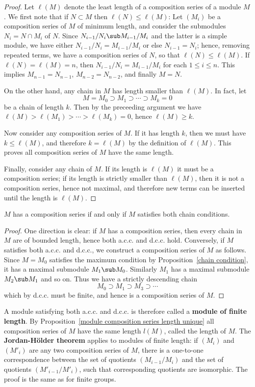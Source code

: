 \begin{proof}
Let $\ell(M)$ denote the least length of a composition series of a module $M$. We first note that if $N\subset M$ then $\ell(N)\leq\ell(M)$: Let $(M_i)$ be a composition series of $M$ of minimum length, and consider the submodules $N_i=N\cap M_i$ of $N$. Since $N_{i-1}/N_i\sub M_{i-1}/M_i$ and the latter is a simple module, we have either $N_{i-1}/N_i=M_{i-1}/M_i$ or else $N_{i-1}=N_i$; hence, removing repeated terms, we have a composition series of $N$, so that $\ell(N)\leq \ell(M)$. If $\ell(N)=\ell(M)=n$, then $N_{i-1}/N_i=M_{i-1}/M_i$ for each $1\leq i\leq n$. This implies $M_{n-1}=N_{n-1}$, $M_{n-2}=N_{n-2}$, and finally $M=N$.\par
On the other hand, any chain in $M$ has length smaller than $\ell(M)$. In fact, let 
\[M=M_0\supset M_1\supset\cdots\supset M_k=0\]
be a chain of length $k$. Then by the preceeding argument we have $\ell(M)>\ell(M_1)>\cdots>\ell(M_k)=0$, hence $\ell(M)\geq k$.\par
Now consider any composition series of $M$. If it has length $k$, then we must have $k\leq\ell(M)$, and therefore $k=\ell(M)$ by the definition of $\ell(M)$. This proves all composition series of $M$ have the same length.\par
Finally, consider any chain of $M$. If its length is $\ell(M)$ it must be a composition series; if its length is strictly smaller than $\ell(M)$, then it is not a composition series, hence not maximal, and therefore new terms can be inserted until the length is $\ell(M)$.
\end{proof}
\begin{proposition}\label{module composition series exist iff acc dcc}
$M$ has a composition series if and only if $M$ satisfies both chain conditions.
\end{proposition}
\begin{proof}
One direction is clear: if $M$ has a composition series, then every chain in $M$ are of bounded length, hence both a.c.c. and d.c.c. hold. Conversely, if $M$ satisfies both a.c.c. and d.c.c., we construct a composition series of $M$ as follows. Since $M=M_0$ satisfies the maximum condition by Proposition~\ref{chain condition}, it has a maximal submodule $M_1\sub M_0$. Similarly $M_1$ has a maximal submodule $M_2\sub M_1$ and so on. Thus we have a strictly descending chain 
\[M_0\supset M_1\supset M_3\supset\cdots\]
which by d.c.c. must be finite, and hence is a composition series of $M$.
\end{proof}
A module satisfying both a.c.c. and d.c.c. is therefore called a \textbf{module of finite length}. By Proposition~\ref{module composition series length unique} all composition series of $M$ have the same length $l(M)$, called the length of $M$. The \textbf{Jordan-H\"older theorem} applies to modules of finite length: if $(M_i)$ and $(M'_i)$ are any two composition series of $M$, there is a one-to-one correspondence between the set of quotients $(M_{i-1}/M_i)$ and the set of quotients $(M'_{i-1}/M'_i)$, such that corresponding quotients are isomorphic. The proof is the same as for finite groups.
